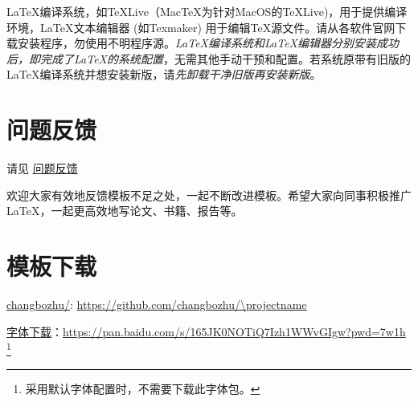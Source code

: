 \LaTeX{}编译系统，如\TeX{}Live（Mac\TeX{}为针对MacOS的\TeX{}Live)，用于提供编译环境，\LaTeX{}文本编辑器 (如Texmaker) 用于编辑\TeX{}源文件。请从各软件官网下载安装程序，勿使用不明程序源。\emph{\LaTeX{}编译系统和\LaTeX{}编辑器分别安装成功后，即完成了\LaTeX{}的系统配置}，无需其他手动干预和配置。若系统原带有旧版的\LaTeX{}编译系统并想安装新版，请\emph{先卸载干净旧版再安装新版}。

\section{问题反馈}

请见 \href{https://github.com/changbozhu/\projectname /issues/}{问题反馈} 

欢迎大家有效地反馈模板不足之处，一起不断改进模板。希望大家向同事积极推广\LaTeX{}，一起更高效地写论文、书籍、报告等。

\section{模板下载}

\begin{center}
    \href{https://github.com/changbozhu/\projectname}{changbozhu/\projectname}: \url{https://github.com/changbozhu/\projectname}
    
    \href{https://pan.baidu.com/s/165JK0NOTiQ7Izh1WWvGIgw?pwd=7w1h}{字体下载}：\url{https://pan.baidu.com/s/165JK0NOTiQ7Izh1WWvGIgw?pwd=7w1h} \footnote{采用默认字体配置时，不需要下载此字体包。}
\end{center}

